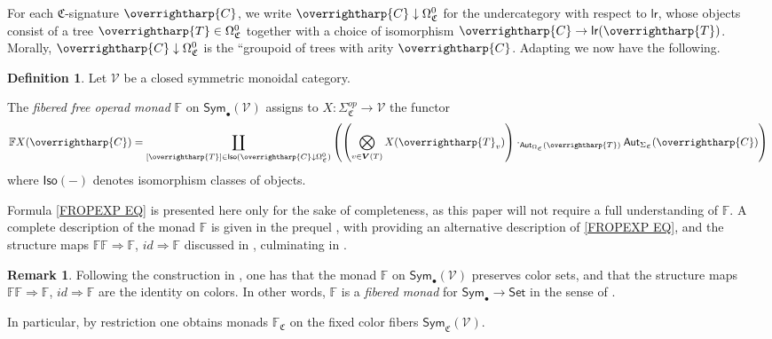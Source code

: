 \documentclass[a4paper,10pt
,draft
]{article}%
\numberwithin{equation}{section}
\numberwithin{figure}{section}
\theoremstyle{definition} %
\newtheorem{definition}[equation]{Definition}%
\newtheorem{remark}[equation]{Remark}%
\newcommand{\vect}[1]{\text{\overrightharp{\ensuremath{#1}}}}
\newcommand{\V}{\ensuremath{\mathcal V}}
\newcommand{\1}{\ensuremath{\mathbbm 1}}%
\begin{document}
For each $\mathfrak{C}$-signature $\vect{C}$,
we write $\vect{C} \downarrow \Omega_{\mathfrak{C}}^0$
for the undercategory with respect to $\mathsf{lr}$, 
whose objects consist of a tree $\vect{T}\in \Omega_{\mathfrak{C}}^0$
together with a choice of isomorphism 
$\vect{C} \to \mathsf{lr}(\vect{T})$.
Morally, $\vect{C} \downarrow \Omega_{\mathfrak{C}}^0$
is the ``groupoid of trees with arity $\vect{C}$.
Adapting \cite[page 816]{BM07} we now have the following.





\begin{definition}\label{FREEOP DEF}
	Let $\mathcal{V}$ be a closed symmetric monoidal category.
	
	The \textit{fibered free operad monad} $\mathbb{F}$ on $\mathsf{Sym}_\bullet(\mathcal{V})$ 
	assigns to 
	$X \colon \Sigma_{\mathfrak{C}}^{op} \to \mathcal{V}$
	the functor
\begin{equation}\label{FROPEXP EQ}
\mathbb{F} X (\vect{C})
=
\coprod_{[\vect{T}] \in 
	\mathsf{Iso}(\vect{C} \downarrow \Omega^0_{\mathfrak{C}})}
\left(
\left(
\bigotimes_{v \in \boldsymbol{V}(T)} X(\vect{T}_v)
\right)
\cdot_{\mathsf{Aut}_{\Omega_{\mathfrak{C}}}(\vect{T})}
\mathsf{Aut}_{\Sigma_{\mathfrak{C}}}(\vect{C})
\right)
\end{equation}
where $\mathsf{Iso}(-)$ denotes isomorphism classes of objects.
\end{definition}


Formula \eqref{FROPEXP EQ}
is presented here only for the sake of completeness,
as this paper will not require a full understanding of 
$\mathbb{F}$.
A complete description of the monad 
$\mathbb{F}$
is given in the prequel \cite{BP_FCOP},
with \cite[Def. \ref{OC-FREEOP DEF}]{BP_FCOP}
providing an alternative description of
\eqref{FROPEXP EQ},
and the structure maps
$\mathbb{F}\mathbb{F} \Rightarrow \mathbb{F}$,
$id \Rightarrow \mathbb{F}$ 
discussed in \cite[App. \ref{OC-MONAD_APDX}]{BP_FCOP},
culminating in \cite[Def. \ref{OC-COLORMON_DEF}]{BP_FCOP}.




\begin{remark}\label{FIBMON REM}
	Following the construction in \cite[Def. \ref{OC-COLORMON_DEF}]{BP_FCOP},
	one has that the monad $\mathbb{F}$
	on $\mathsf{Sym}_{\bullet}(\V)$
	preserves color sets,
	and that the structure maps
	$\mathbb{F}\mathbb{F} \Rightarrow \mathbb{F}$,
	$id \Rightarrow \mathbb{F}$
	are the identity on colors.
	In other words,
	$\mathbb{F}$ is a \emph{fibered monad} for
	$\mathsf{Sym}_{\bullet} \to \mathsf{Set}$
	in the sense of 
	\cite[Def. \ref{OC-FIBMON DEF}]{BP_FCOP}.
	
	In particular, 
	by restriction one obtains monads
	$\mathbb{F}_{\mathfrak{C}}$
	on the fixed color fibers 
	$\mathsf{Sym}_{\mathfrak{C}}(\V)$.
\end{remark}
\end{document}
